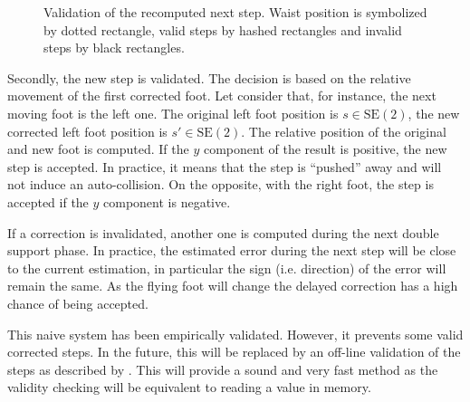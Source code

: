 \begin{figure}[ht!]
\begin{center}
  \end{center}
  \caption{Validation of the recomputed next step. Waist position is
    symbolized by dotted rectangle, valid steps by hashed rectangles
    and invalid steps by black rectangles.
    \label{fig:stepvalid}}
\end{figure}


Secondly, the new step is validated. The decision is based on the
relative movement of the first corrected foot. Let consider that, for
instance, the next moving foot is the left one. The original left foot
position is \mbox{$s \in \text{SE}(2)$}, the new corrected left foot
position is \mbox{$s' \in \text{SE}(2)$}. The relative position of the
original and new foot is computed. If the $y$ component of the result
is positive, the new step is accepted. In practice, it means that the
step is ``pushed'' away and will not induce an auto-collision. On the
opposite, with the right foot, the step is accepted if the $y$
component is negative.


If a correction is invalidated, another one is computed during the
next double support phase. In practice, the estimated error during the
next step will be close to the current estimation, in particular the
sign (i.e. direction) of the error will remain the same. As the flying
foot will change the delayed correction has a high chance of being
accepted.


This naive system has been empirically validated. However, it prevents
some valid corrected steps. In the future, this will be replaced by an
off-line validation of the steps as described by
\cite{10icra.perrin}. This will provide a sound and very fast method as
the validity checking will be equivalent to reading a value in memory.

\FloatBarrier

